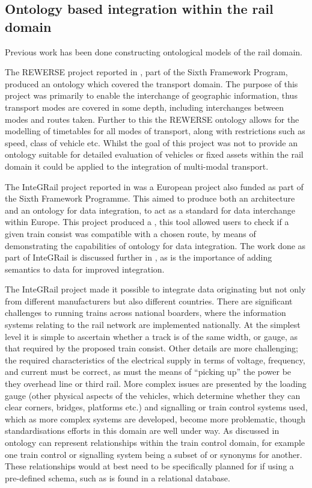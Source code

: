\subsection{Ontology based integration within the rail domain}
\label{sec:prevonto}
Previous work has been done constructing ontological models of the rail domain.

The REWERSE project reported in \citet{Lorenz2005a}, part of the Sixth Framework Program, produced an ontology which covered the transport domain. The purpose of this project was primarily to enable the interchange of geographic information, thus transport modes are covered in some depth, including interchanges between modes and routes taken. Further to this the REWERSE ontology allows for the modelling of timetables for all modes of transport, along with restrictions such as speed, class of vehicle etc. Whilst the goal of this project was not to provide an ontology suitable for detailed evaluation of vehicles or fixed assets within the rail domain it could be applied to the integration of multi-modal transport.

The InteGRail project reported in \citet{Kopf2010} was a European project also funded as part of the Sixth Framework Programme. This aimed to produce both an architecture and an ontology for data integration, to act as a standard for data interchange within Europe. This project produced a , this tool allowed users to check if a given train consist was compatible with a chosen route, by means of demonstrating the capabilities of ontology for data integration. The work done as part of InteGRail is discussed further in \citet{Verstichel2011}, as is the importance of adding semantics to data for improved integration. 

The InteGRail project made it possible to integrate data originating but not only from different manufacturers but also different countries. There are significant challenges to running trains across national boarders, where the information systems relating to the rail network are implemented nationally. At the simplest level it is simple to ascertain whether a track is of the same width, or gauge, as that required by the proposed train consist. Other details are more challenging; the required characteristics of the electrical supply in terms of voltage, frequency, and current must be correct, as must the means of ``picking up'' the power be they overhead line or third rail. More complex issues are presented by the loading gauge (other physical aspects of the vehicles, which determine whether they can clear corners, bridges, platforms etc.) and signalling or train control systems used, which as more complex systems are developed, become more problematic, though standardisations efforts in this domain are well under way. As discussed in \citet{Verstichel2011} ontology can represent relationships within the train control domain, for example one train control or signalling system being a subset of or synonyms for another. These relationships would at best need to be specifically planned for if using a pre-defined schema, such as is found in a relational database.

